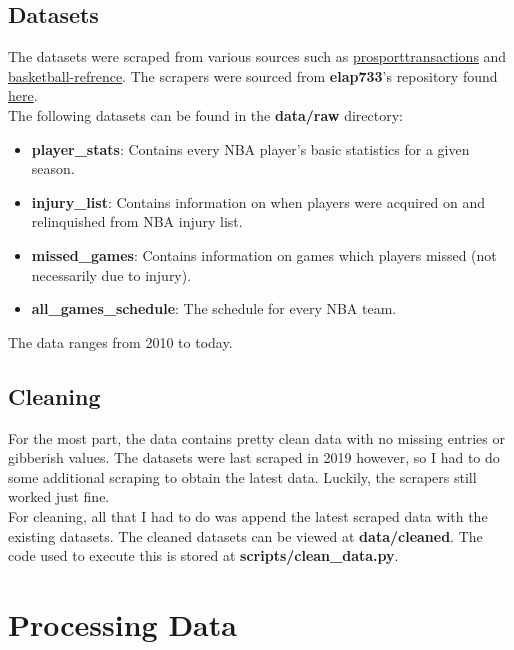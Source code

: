 \documentclass{article}
\begin{document}
\subsection*{Datasets}

The datasets were scraped from various sources such as 
\href{https://www.prosportstransactions.com/basketball}{prosporttransactions} and 
\href{https://www.basketball-reference.com/}{basketball-refrence}. The scrapers
were sourced from \textbf{elap733}'s repository found
\href{https://github.com/elap733/NBA-Injuries-Analysis/tree/master/src/d01_scrapes}{here}.\\

The following datasets can be found in the \textbf{data/raw} directory:
\begin{itemize}
    \item \textbf{player\_stats}: Contains every NBA player's basic statistics for a given season.
    \item \textbf{injury\_list}: Contains information on when players were acquired on and relinquished from NBA injury list.
    \item \textbf{missed\_games}: Contains information on games which players missed (not necessarily due to injury).
    \item \textbf{all\_games\_schedule}: The schedule for every NBA team.
\end{itemize}

The data ranges from 2010 to today.

\subsection*{Cleaning}

For the most part, the data contains pretty clean data with no missing entries
or gibberish values. The datasets were last scraped in 2019 however, so I had to 
do some additional scraping to obtain the latest data. Luckily, the scrapers 
still worked just fine.\\

For cleaning, all that I had to do was append the latest scraped data
with the existing datasets. The cleaned datasets can be viewed at \textbf{data/cleaned}.
The code used to execute this is stored at \textbf{scripts/clean\_data.py}.

\section*{Processing Data}
\end{document}
